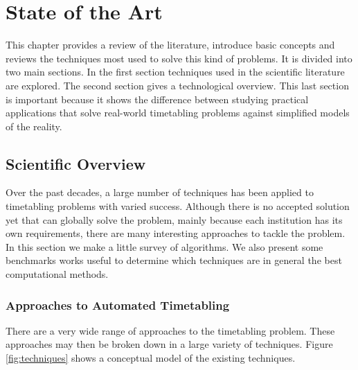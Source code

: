 \setcounter{tocdepth}{4}

\chapter{State of the Art} %

\label{art} %


This chapter provides a review of the literature, introduce basic concepts and reviews the techniques most used to solve this kind of problems. It is divided into two main sections. In the first section techniques used in the scientific literature are explored. The second section gives a technological overview. This last section is important because it shows the difference between studying practical applications that solve real-world timetabling problems against simplified models of the reality.

\section{Scientific Overview}

Over the past decades, a large number of techniques has been applied to timetabling problems with varied success. Although there is no accepted solution yet that can globally solve the problem, mainly because each institution has its own requirements, there are many interesting approaches to tackle the problem. In this section we make a little survey of algorithms. We also present some benchmarks works useful to determine which techniques are in general the best computational methods. 
\subsection{Approaches to Automated Timetabling}

There are a very wide range of approaches to the timetabling problem. These approaches may then be broken down in a large variety of techniques. Figure \ref{fig:techniques} shows a conceptual model of the existing techniques.

